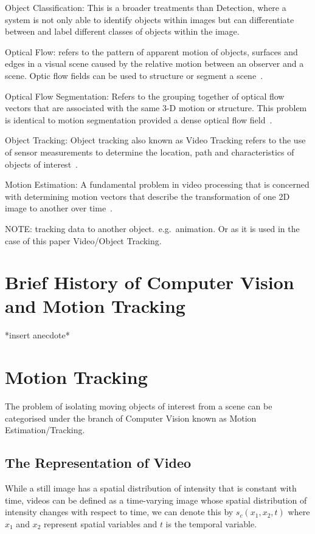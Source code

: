 Object Classification: This is a broader treatments than Detection, where a
system is not only able to identify objects within images but can differentiate
between and label different classes of objects within the image. 

Optical Flow: refers to the pattern of apparent motion of objects, surfaces and
edges in a visual scene caused by the relative motion between an observer and a
scene. Optic flow fields can be used to structure or segment a scene~\cite{Forsyth2012}.

Optical Flow Segmentation: Refers to the grouping together of optical flow
vectors that are associated with the same 3-D motion or structure. This problem
is identical to motion segmentation provided a dense optical flow field~\cite{Tekalp2014}.

Object Tracking: Object tracking also known as Video Tracking refers to the use
of sensor measurements to determine the location, path and characteristics of
objects of interest~\cite{Challa2011}.
 
Motion Estimation: A fundamental problem in video processing that is concerned
with determining motion vectors that describe the transformation of one 2D
image to another over time~\cite{Tekalp2014}.

NOTE:\@
tracking data to another object.\ e.g.\ animation. Or as it is used in the
case of this paper Video/Object Tracking.

\section{Brief History of Computer Vision and Motion Tracking}
*insert anecdote*


\section{Motion Tracking}
The problem of isolating moving objects of interest from a scene can
be categorised under the branch of Computer Vision known as Motion
Estimation/Tracking.

\subsection{The Representation of Video}
While a still image has a spatial distribution of intensity that is constant
with time, videos can be defined as a time-varying image whose spatial
distribution of intensity changes with respect to time, we can denote this by
$s_c(x_1,x_2,t)$ where $x_1$ and $x_2$ represent spatial variables and $t$ is
the temporal variable. \cite{Tekalp2014}

